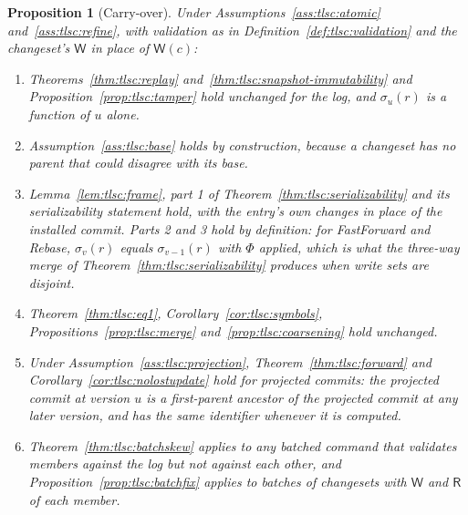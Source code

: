 \documentclass[11pt,letterpaper]{article}
\newtheorem{proposition}[theorem]{Proposition}
\theoremstyle{definition}
\theoremstyle{remark}
\newcommand{\R}{\mathsf{R}}
\newcommand{\W}{\mathsf{W}}
\begin{document}
\begin{proposition}[Carry-over]
\label{prop:tlsc:carryover}
Under Assumptions~\ref{ass:tlsc:atomic} and~\ref{ass:tlsc:refine}, with validation as in Definition~\ref{def:tlsc:validation} and the changeset's $\W$ in place of $\W(c)$:
\begin{enumerate}
\item Theorems~\ref{thm:tlsc:replay} and~\ref{thm:tlsc:snapshot-immutability} and Proposition~\ref{prop:tlsc:tamper} hold unchanged for the log, and $\sigma_u(r)$ is a function of $u$ alone.
\item Assumption~\ref{ass:tlsc:base} holds by construction, because a changeset has no parent that could disagree with its base.
\item Lemma~\ref{lem:tlsc:frame}, part 1 of Theorem~\ref{thm:tlsc:serializability} and its serializability statement hold, with the entry's own changes in place of the installed commit. Parts 2 and 3 hold by definition: for FastForward and Rebase, $\sigma_v(r)$ equals $\sigma_{v-1}(r)$ with $\Phi$ applied, which is what the three-way merge of Theorem~\ref{thm:tlsc:serializability} produces when write sets are disjoint.
\item Theorem~\ref{thm:tlsc:eq1}, Corollary~\ref{cor:tlsc:symbols}, Propositions~\ref{prop:tlsc:merge} and~\ref{prop:tlsc:coarsening} hold unchanged.
\item Under Assumption~\ref{ass:tlsc:projection}, Theorem~\ref{thm:tlsc:forward} and Corollary~\ref{cor:tlsc:nolostupdate} hold for projected commits: the projected commit at version $u$ is a first-parent ancestor of the projected commit at any later version, and has the same identifier whenever it is computed.
\item Theorem~\ref{thm:tlsc:batchskew} applies to any batched command that validates members against the log but not against each other, and Proposition~\ref{prop:tlsc:batchfix} applies to batches of changesets with $\W$ and $\R$ of each member.
\end{enumerate}
\end{proposition}
\end{document}
